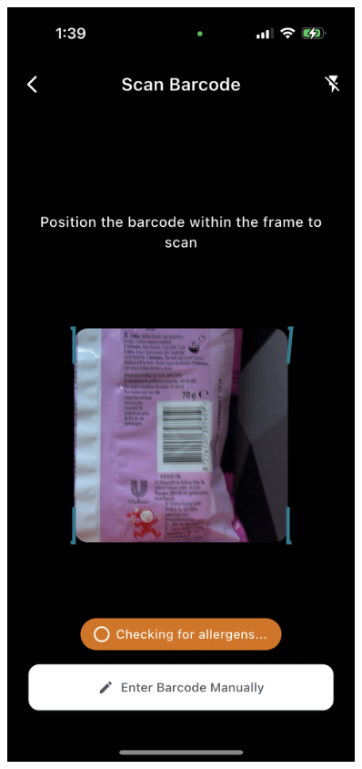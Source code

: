 \documentclass[MScCS]{uccthesis}
\begin{document}
\begin{figure}[htbp]
    \centering
    \begin{minipage}[b]{0.3\textwidth}
        \centering
        \includegraphics[width=0.9\textwidth,height=0.4\textheight,keepaspectratio]{Figures/barcode_scanner_camera.png}
    \end{minipage}

\end{figure}
\end{document}
